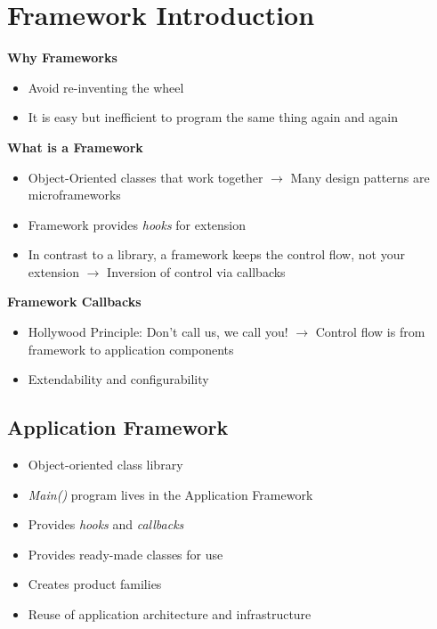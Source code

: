 \section{Framework Introduction}
\textbf{Why Frameworks}
\begin{itemize}[topsep=0pt]
    \itemsep -0.4em
    \item Avoid re-inventing the wheel
    \item It is easy but inefficient to program the same thing again and again
\end{itemize}
\textbf{What is a Framework}
\begin{itemize}[topsep=0pt]
    \itemsep -0.4em
    \item Object-Oriented classes that work together $\rightarrow$ Many design patterns are microframeworks
    \item Framework provides \textit{hooks} for extension
    \item In contrast to a library, a framework keeps the control flow, not your extension $\rightarrow$ Inversion of control via callbacks
\end{itemize}
\textbf{Framework Callbacks}
\begin{itemize}[topsep=0pt]
    \itemsep -0.4em
    \item Hollywood Principle: Don't call us, we call you! $\rightarrow$ Control flow is from framework to application components
    \item Extendability and configurability
\end{itemize}
\subsection{Application Framework}
\begin{itemize}[topsep=0pt]
    \itemsep -0.4em
    \item Object-oriented class library
    \item \textit{Main()} program lives in the Application Framework
    \item Provides \textit{hooks} and \textit{callbacks}
    \item Provides ready-made classes for use
    \item Creates product families
    \item Reuse of application architecture and infrastructure
\end{itemize}
